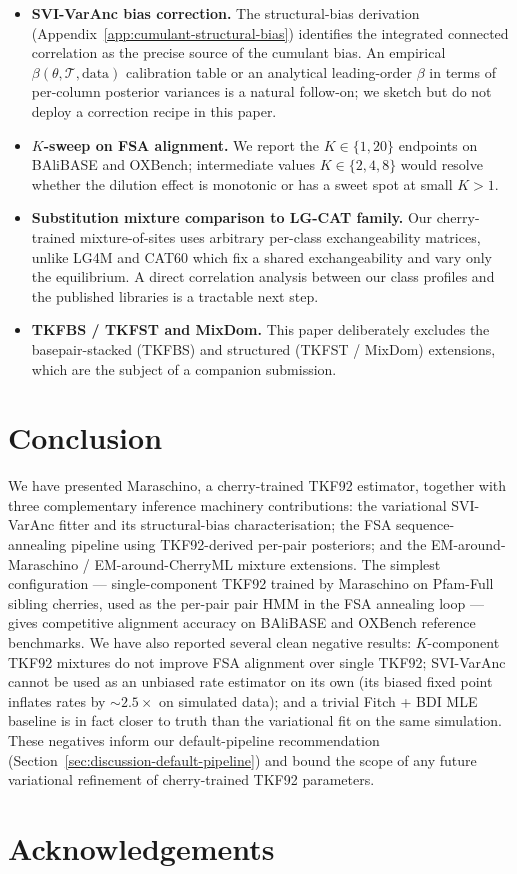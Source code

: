 \begin{itemize}
\item \textbf{SVI-VarAnc bias correction.}  The structural-bias
  derivation (Appendix~\ref{app:cumulant-structural-bias})
  identifies the integrated connected correlation as the precise
  source of the cumulant bias.  An empirical
  $\beta(\theta, \mathcal{T}, \text{data})$ calibration table or an
  analytical leading-order $\beta$ in terms of per-column
  posterior variances is a natural follow-on; we sketch but do
  not deploy a correction recipe in this paper.
\item \textbf{$K$-sweep on FSA alignment.}  We report the $K \in
  \{1, 20\}$ endpoints on BAliBASE and OXBench; intermediate
  values $K \in \{2, 4, 8\}$ would resolve whether the dilution
  effect is monotonic or has a sweet spot at small $K > 1$.
\item \textbf{Substitution mixture comparison to LG-CAT family.}
  Our cherry-trained mixture-of-sites uses arbitrary per-class
  exchangeability matrices, unlike LG4M and CAT$60$
  which fix a shared exchangeability and vary only the equilibrium.
  A direct correlation analysis between our class profiles and
  the published libraries is a tractable next step.
\item \textbf{TKFBS / TKFST and MixDom.}  This paper deliberately
  excludes the basepair-stacked (TKFBS) and structured
  (TKFST / MixDom) extensions, which are the subject of a
  companion submission.
\end{itemize}

\section{Conclusion}
\label{sec:conclusion}

We have presented Maraschino, a cherry-trained TKF92 estimator,
together with three complementary inference machinery contributions:
the variational SVI-VarAnc fitter and its structural-bias
characterisation; the FSA sequence-annealing pipeline using
TKF92-derived per-pair posteriors; and the EM-around-Maraschino /
EM-around-CherryML mixture extensions.  The simplest configuration
--- single-component TKF92 trained by Maraschino on Pfam-Full
sibling cherries, used as the per-pair pair HMM in the FSA
annealing loop --- gives competitive alignment accuracy on
BAliBASE and OXBench reference benchmarks.  We have also reported
several clean negative results: $K$-component TKF92 mixtures do
not improve FSA alignment over single TKF92; SVI-VarAnc cannot be
used as an unbiased rate estimator on its own (its biased fixed
point inflates rates by $\sim 2.5\times$ on simulated data); and a
trivial Fitch + BDI MLE baseline is in fact closer to truth than
the variational fit on the same simulation.  These negatives
inform our default-pipeline recommendation
(Section~\ref{sec:discussion-default-pipeline}) and bound the
scope of any future variational refinement of cherry-trained TKF92
parameters.

\section{Acknowledgements}

